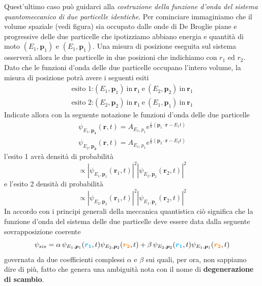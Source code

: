 Quest’ultimo caso può guidarci alla \emph{costruzione della funzione d’onda del sistema quantomeccanico di due particelle identiche}.
Per cominciare immaginiamo che il volume spaziale (vedi figura) sia occupato dalle onde di De Broglie piane e progressive delle due particelle che ipotizziamo abbiano energia e quantità di moto $(E_{1},\mathbf{p}_{1})$ e $(E_{1},\mathbf{p}_{1})$. Una misura di posizione eseguita sul sistema osserverà allora le due particelle in due posizioni che indichiamo con $r_{1}$ ed $r_{2}$. Dato che le funzioni d’onda delle due particelle occupano l’intero volume, la misura di posizione potrà avere i seguenti esiti
\begin{gather*}
    \text{esito 1:} (E_{1}, \mathbf{p}_{1}) \ \text{in} \ \mathbf{r}_{1} \ \text{e} \ (E_{2}, \mathbf{p}_{2}) \ \text{in} \ \mathbf{r}_{1}\\
    \text{esito 2:} (E_{2}, \mathbf{p}_{2}) \ \text{in} \ \mathbf{r}_{1} \ \text{e} \ (E_{1}, \mathbf{p}_{1}) \ \text{in} \ \mathbf{r}_{1}
\end{gather*}
Indicate allora con la seguente notazione le funzioni d’onda delle due particelle
\begin{gather*}
    \psi_{E_{1},\mathbf{{p}_{1}}}(\mathbf{{r}},t) = A_{E_{1},\mathbf{}{p}_{1}}e^{ \frac{i}{\hbar} (\mathbf{{p}}_{1} \cdot \mathbf{{r}}-E_{1}t)}\\
    \psi_{E_{2},\mathbf{{p}_{2}}}(\mathbf{{r}},t) = A_{E_{1},\mathbf{}{p}_{1}}e^{ \frac{i}{\hbar} (\mathbf{{p}}_{2} \cdot \mathbf{{r}}-E_{2}t)}
\end{gather*}
l’esito 1 avrà densità di probabilità
\[
\propto | \psi_{E_{1},\mathbf{p}_{1}}(\mathbf{r}_{1},t)|^{2} | \psi_{E_{2},\mathbf{p}_{2}}(\mathbf{r}_{2},t)|^{2}
\]
e l’esito 2 densità di probabilità
\[
\propto | \psi_{E_{2},\mathbf{p}_{2}}(\mathbf{r}_{1},t)|^{2} | \psi_{E_{1},\mathbf{p}_{1}}(\mathbf{r}_{2},t)|^{2}
\]
In accordo con i principi generali della meccanica quantistica ciò significa che la funzione d’onda del sistema delle due particelle deve essere data dalla seguente sovrapposizione coerente
\begin{equation}
    \psi_{sis} = \alpha \, \psi_{E_{1},\bm{p}_{1}}(\textcolor{cyan}{\bm{r_1}},t) \psi_{E_{2},\bm{p}_{2}}(\textcolor{orange}{\bm{r_2}},t) +
    \beta \, \psi_{E_{2},\bm{p}_{2}}(\textcolor{cyan}{\bm{r_1}},t) \psi_{E_{1},\bm{p}_{1}}(\textcolor{orange}{\bm{r_2}},t)
    \label{eq:total-system-wave-function-identical-particles}
\end{equation}
governata da due coefficienti complessi $\alpha$ e $\beta$ sui quali, per ora, non sappiamo dire di più, fatto che genera una ambiguità nota con il nome di \textbf{degenerazione di scambio}.
\bigskip

